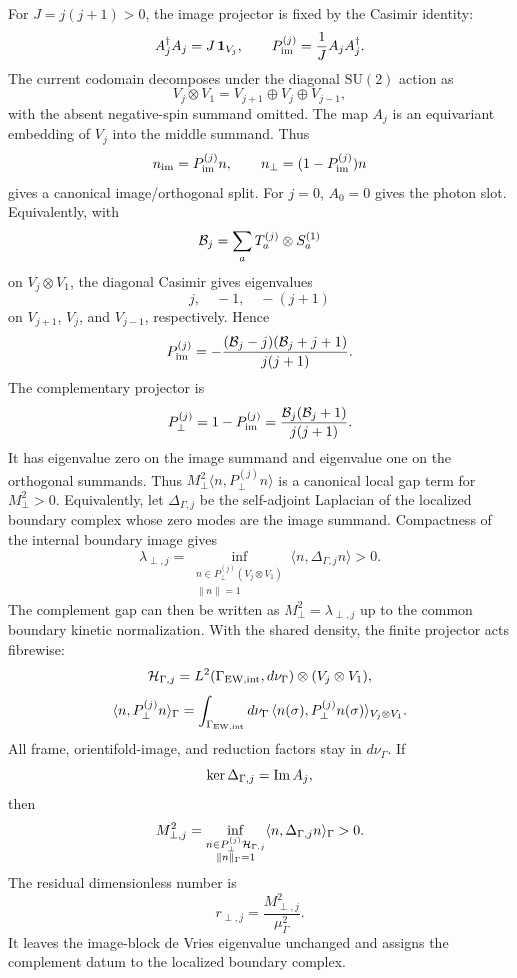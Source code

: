 \documentclass[11pt]{article}
\theoremstyle{definition}
\theoremstyle{remark}
\newcommand{\SU}{\mathrm{SU}}
\begin{document}
For \(J=j(j+1)>0\), the image projector is fixed by the Casimir identity:
\[
  A_j^\dagger A_j=J\,\bm1_{V_j},
  \qquad
  P_{\rm im}^{(j)}=\frac{1}{J}A_jA_j^\dagger .
\]
The current codomain decomposes under the diagonal \(\SU(2)\) action as
\[
  V_j\otimes V_1=V_{j+1}\oplus V_j\oplus V_{j-1},
\]
with the absent negative-spin summand omitted.  The map \(A_j\) is an
equivariant embedding of \(V_j\) into the middle summand.  Thus
\[
  n_{\rm im}=P_{\rm im}^{(j)}n,
  \qquad
  n_\perp=(1-P_{\rm im}^{(j)})n
\]
gives a canonical image/orthogonal split.  For \(j=0\), \(A_0=0\) gives the
photon slot.
Equivalently, with
\[
  {\cal B}_j=\sum_aT_a^{(j)}\otimes S_a^{(1)}
\]
on \(V_j\otimes V_1\), the diagonal Casimir gives eigenvalues
\[
  j,\quad -1,\quad -(j+1)
\]
on \(V_{j+1}\), \(V_j\), and \(V_{j-1}\), respectively.  Hence
\[
  P_{\rm im}^{(j)}
  =
  -\frac{({\cal B}_j-j)({\cal B}_j+j+1)}{j(j+1)}.
\]
The complementary projector is
\[
  P_{\perp}^{(j)}
  =
  1-P_{\rm im}^{(j)}
  =
  \frac{{\cal B}_j({\cal B}_j+1)}{j(j+1)}.
\]
It has eigenvalue zero on the image summand and eigenvalue one on the
orthogonal summands.  Thus \(M_\perp^2\langle n,P_\perp^{(j)}n\rangle\) is a
canonical local gap term for \(M_\perp^2>0\).
Equivalently, let \(\Delta_{\Gamma,j}\) be the self-adjoint Laplacian of the
localized boundary complex whose zero modes are the image summand.  Compactness
of the internal boundary image gives
\[
  \lambda_{\perp,j}
  =
  \inf_{\substack{n\in P_\perp^{(j)}(V_j\otimes V_1)\\ \|n\|=1}}
  \langle n,\Delta_{\Gamma,j}n\rangle
  >
  0.
\]
The complement gap can then be written as \(M_\perp^2=\lambda_{\perp,j}\)
up to the common boundary kinetic normalization.
With the shared density, the finite projector acts fibrewise:
\[
  {\cal H}_{\Gamma,j}
  =
  L^2(\Gamma_{\rm EW,int},d\nu_\Gamma)
  \otimes (V_j\otimes V_1),
\]
\[
  \langle n,P_\perp^{(j)}n\rangle_\Gamma
  =
  \int_{\Gamma_{\rm EW,int}}d\nu_\Gamma\,
  \langle n(\sigma),P_\perp^{(j)}n(\sigma)\rangle_{V_j\otimes V_1}.
\]
All frame, orientifold-image, and reduction factors stay in \(d\nu_\Gamma\).
If
\[
  \ker\Delta_{\Gamma,j}={\rm Im}\,A_j,
\]
then
\[
  M_{\perp,j}^2
  =
  \inf_{\substack{
  n\in P_\perp^{(j)}{\cal H}_{\Gamma,j}\\
  \|n\|_\Gamma=1}}
  \langle n,\Delta_{\Gamma,j}n\rangle_\Gamma
  >
  0.
\]
The residual dimensionless number is
\[
  r_{\perp,j}=\frac{M_{\perp,j}^2}{\mu_\Gamma^2}.
\]
It leaves the image-block de Vries eigenvalue unchanged and assigns the
complement datum to the localized boundary complex.
\end{document}
